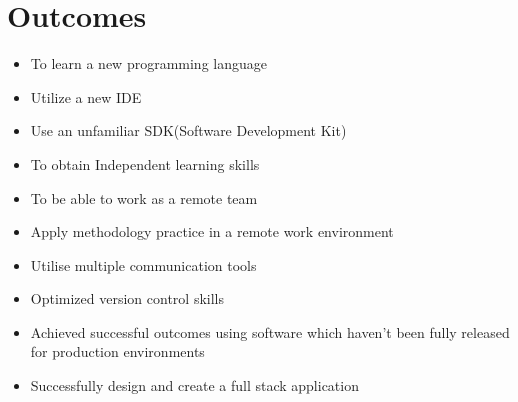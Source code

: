 \section{Outcomes}
\begin{itemize}
    \item To learn a new programming language
    \item Utilize a new IDE
    \item Use an unfamiliar SDK(Software Development Kit)
    \item To obtain Independent learning skills
    \item To be able to work as a remote team
    \item Apply methodology practice in a remote work environment
    \item Utilise multiple communication tools
    \item Optimized version control skills
    \item Achieved successful outcomes using software which haven't been fully released for production environments
    \item Successfully design and create a full stack application


\end{itemize}
